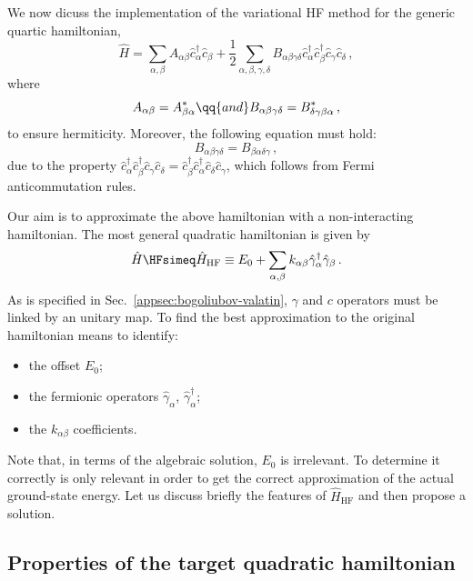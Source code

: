 We now dicuss the implementation of the variational HF method for the generic quartic hamiltonian,
\begin{equation}\label{eq:hf-quartic-H}
	\hat H = \sum_{\alpha,\beta} A_{\alpha\beta} \hat c_\alpha^\dagger \hat c_\beta + \frac{1}{2} \sum_{\alpha,\beta,\gamma,\delta} B_{\alpha\beta\gamma\delta} \hat c_\alpha^\dagger \hat c_\beta^\dagger \hat c_\gamma \hat c_\delta \, ,
\end{equation}
where
\begin{equation}\label{eq:hf-AB-syms}
	A_{\alpha\beta} = A_{\beta\alpha}^*
	\qq{and}
	B_{\alpha\beta\gamma\delta} = B_{\delta\gamma\beta\alpha}^* \, ,
\end{equation}
to ensure hermiticity. Moreover, the following equation must hold:
\begin{equation}\label{eq:hf-B-sym}
	B_{\alpha\beta\gamma\delta} = B_{\beta\alpha\delta\gamma} \, ,
\end{equation}
due to the property $\hat c_\alpha^\dagger \hat c_\beta^\dagger \hat c_\gamma \hat c_\delta = \hat c_\beta^\dagger \hat c_\alpha^\dagger \hat c_\delta \hat c_\gamma$, which follows from Fermi anticommutation rules.

Our aim is to approximate the above hamiltonian with a non-interacting hamiltonian. The most general quadratic hamiltonian is given by
\begin{equation}\label{eq:hf-Hhf-k}
	\hat H \HFsimeq \hat H_\mathrm{HF} \equiv E_0 + \sum_{\alpha,\beta} k_{\alpha\beta} \hat\gamma_\alpha^\dagger \hat\gamma_\beta \, .
\end{equation}
As is specified in Sec.~\ref{appsec:bogoliubov-valatin}, $\gamma$ and $c$ operators must be linked by an unitary map. To find the best approximation to the original hamiltonian means to identify:
\begin{itemize}
	\item the offset $E_0$;
	\item the fermionic operators $\hat \gamma_\alpha$, $\hat \gamma_\alpha^\dagger$;
	\item the $k_{\alpha\beta}$ coefficients. 
\end{itemize}
Note that, in terms of the algebraic solution, $E_0$ is irrelevant. To determine it correctly is only relevant in order to get the correct approximation of the actual ground-state energy. Let us discuss briefly the features of $\hat H_\mathrm{HF}$ and then propose a solution.

\subsection{Properties of the target quadratic hamiltonian}

